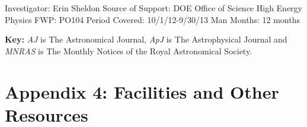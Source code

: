 \documentclass[12pt]{article}
\begin{document}
\vspace{5mm}
\noindent
Investigator: Erin Sheldon\newline
Source of Support: DOE Office of Science\newline
High Energy Physics\newline
FWP: PO104\newline
Period Covered: 10/1/12-9/30/13\newline
Man Months: 12 months

\newpage
{}
\renewcommand{\refname}{\section*{Appendix 3: Bibliography for Narrative}\label{app:bib}}


\vspace{5mm}
\noindent
{\bf Key:} {\it AJ} is The Astronomical Journal, {\it ApJ} is The 
Astrophysical Journal and {\it MNRAS} is The Monthly Notices of the Royal
Astronomical Society.






\newpage
{}
\section*{Appendix 4: Facilities and Other Resources}
\end{document}
